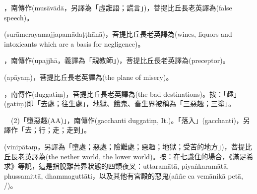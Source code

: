 \startitemgroup[noteitems]
\item{}，南傳作(musāvādā，另譯為「虛誑語；謊言」)，菩提比丘長老英譯為(false speech)。
\stopitemgroup

\startitemgroup[noteitems]
\item{}(surāmerayamajjapamādaṭṭhānā)，菩提比丘長老英譯為(wines, liquors and intoxicants which are a basis for negligence)。
\stopitemgroup

\startitemgroup[noteitems]
\item{}，南傳作(upajjhā，義譯為「親教師」)，菩提比丘長老英譯為(preceptor)。
\stopitemgroup

\startitemgroup[noteitems]
\item{}(apāyaṃ)，菩提比丘長老英譯為(the plane of misery)。
\stopitemgroup

\startitemgroup[noteitems]
\item{}，南傳作(duggatiṃ)，菩提比丘長老英譯為(the bad destinations)。按：「趣」(gatiṃ)即「去處；往生處」，地獄、餓鬼、畜生界被稱為「三惡趣；三塗」。
\item{}　(2)「墮惡趣(AA)」，南傳作(gacchanti duggatiṃ, It.)。「落入」(gacchanti)，另譯作「去；行；走；走到」。
\stopitemgroup

\startitemgroup[noteitems]
\item{}(vinipātaṃ，另譯為「墮處；惡處；險難處；惡趣；地獄；受苦的地方」)，菩提比丘長老英譯為(the nether world, the lower world)。按：在七識住的場合，《滿足希求》等說，這是指脫離苦界狀態的四類夜叉：uttaramātā, piyaṅkaramātā, phussamittā, dhammaguttāti，以及其他有宮殿的惡鬼(aññe ca vemānikā petā, /)。
\stopitemgroup

